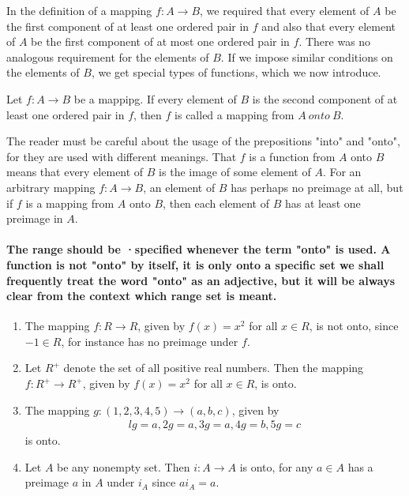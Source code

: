 \documentclass[11pt]{amsbook}
\begin{document}

    In the definition of a mapping $ f: A \to B $, we required that every element of $A$  be the first component of at least one ordered pair in $f$ and also that every element of $A$ be the first component of at most one ordered pair in $f$. There was no analogous requirement for the elements of $B$.  If we impose similar conditions on the elements of $B$, we get special types of functions, which we now introduce. 
    
    \begin{defn}
        Let $ f: A \to B $ be a mappipg. If every element of $B$ is the second component of at least one ordered pair in $f$, then $f$ is called a mapping from $A \ onto \ B$. 
    \end{defn}
    
    The reader must be careful about the usage of the prepositions "into" and "onto", for they are used with different meanings. That $f$ is a function from $A$ onto $B$ means that every element of $B$ is the image of some element of $A$. For an arbitrary mapping $f: A \to B$, an element of $B$ has perhaps no preimage at all, but if $f$ is a mapping from $A$ onto $B$, then each element of $B$ has at least one preimage in $A$. 
    
    \paragraph{
        The range should be ·specified whenever the term "onto" is used. A function is not "onto" by itself, it is only onto a specific set we shall frequently treat the word "onto" as an adjective, but it will be always clear from the context which range set is meant. 
    }
    
    \begin{exmp}
        \begin{enumerate}[label=(\alph*)]
            \item The mapping $ f: R \to R$, given by $f(x) = x^2$ for all $ x \in R$, is not onto, since $-1 \in R$, for instance has no preimage under $f$.
            \item Let $R^+$ denote the set of all positive real numbers. Then the mapping $ f: R^+ \to R^+$, given by $f(x) = x^2$ for all $ x \in R$, is onto.
            \item The mapping $ g: (1,2,3,4,5) \to (a,b,c)$, given by 
                \begin{align*}
                    lg = a, 2g = a, 3g = a, 4g = b, 5g = c 
                \end{align*}
            is onto.
            \item Let $A$ be any nonempty set. Then $ i: A \to A$ is onto, for any $a \in A$ has a preimage $a$ in $A$ under $i_A$ since $ai_A = a$.
        \end{enumerate}
        
    \end{exmp}
\end{document}

